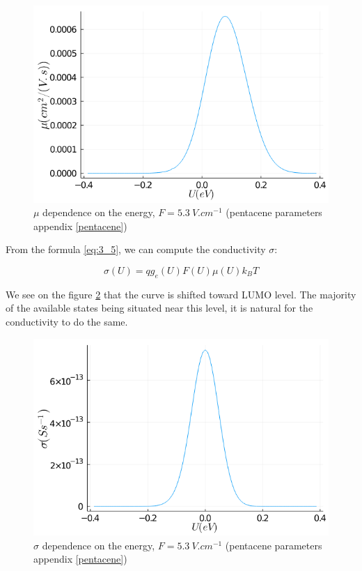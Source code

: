 \begin{figure}[!h]
    \centering
    \includegraphics*[width=.5\paperwidth]{figures/3_elec/mobi_energy.png}
    \caption{$\mu$ dependence on the energy, $F = \SI{5.3}{V . cm^{-1}}$ (pentacene parameters appendix \ref{pentacene})\label{fig:3_8}}
\end{figure}

From the formula \ref{eq:3_5}, we can compute the conductivity $\sigma$:

\begin{equation}
    \sigma(U) = qg_e(U)F(U)\mu(U)k_B T
\end{equation}

We see on the figure \ref{fig:3_9} that the curve is shifted toward LUMO level. The majority of the available states being situated near this level, it is natural for the conductivity to do the same.

\begin{figure}[!h]
    \centering
    \includegraphics*[width=.5\paperwidth]{figures/3_elec/conduction_u.png}
    \caption{$\sigma$ dependence on the energy, $F = \SI{5.3}{V . cm^{-1}}$ (pentacene parameters appendix \ref{pentacene})\label{fig:3_9}}
\end{figure}


